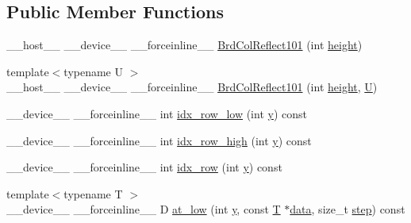 \subsection*{Public Member Functions}
\begin{DoxyCompactItemize}
\item 
\-\_\-\-\_\-host\-\_\-\-\_\- \-\_\-\-\_\-device\-\_\-\-\_\- \-\_\-\-\_\-forceinline\-\_\-\-\_\- \hyperlink{structcv_1_1gpu_1_1device_1_1BrdColReflect101_a6052653f2845007680047223cfd32a13}{Brd\-Col\-Reflect101} (int \hyperlink{highgui__c_8h_adc7b4b8a6ef510e136071efbc9cd9a58}{height})
\item 
{\footnotesize template$<$typename U $>$ }\\\-\_\-\-\_\-host\-\_\-\-\_\- \-\_\-\-\_\-device\-\_\-\-\_\- \-\_\-\-\_\-forceinline\-\_\-\-\_\- \hyperlink{structcv_1_1gpu_1_1device_1_1BrdColReflect101_ad760f4377beec9378172e994a9469958}{Brd\-Col\-Reflect101} (int \hyperlink{highgui__c_8h_adc7b4b8a6ef510e136071efbc9cd9a58}{height}, \hyperlink{core__c_8h_aa9c521f41af9a5191e5e4b6ffbae211a}{U})
\item 
\-\_\-\-\_\-device\-\_\-\-\_\- \-\_\-\-\_\-forceinline\-\_\-\-\_\- int \hyperlink{structcv_1_1gpu_1_1device_1_1BrdColReflect101_ad88211682b56ad96312a9cea8eb9201d}{idx\-\_\-row\-\_\-low} (int \hyperlink{highgui__c_8h_af1202c02b14870c18fb3a1da73e9e7c7}{y}) const 
\item 
\-\_\-\-\_\-device\-\_\-\-\_\- \-\_\-\-\_\-forceinline\-\_\-\-\_\- int \hyperlink{structcv_1_1gpu_1_1device_1_1BrdColReflect101_a4a1a54ee230a6066301e8a7f9b0f03c6}{idx\-\_\-row\-\_\-high} (int \hyperlink{highgui__c_8h_af1202c02b14870c18fb3a1da73e9e7c7}{y}) const 
\item 
\-\_\-\-\_\-device\-\_\-\-\_\- \-\_\-\-\_\-forceinline\-\_\-\-\_\- int \hyperlink{structcv_1_1gpu_1_1device_1_1BrdColReflect101_ac24f041d475d9361a8c478e0241d5b2a}{idx\-\_\-row} (int \hyperlink{highgui__c_8h_af1202c02b14870c18fb3a1da73e9e7c7}{y}) const 
\item 
{\footnotesize template$<$typename T $>$ }\\\-\_\-\-\_\-device\-\_\-\-\_\- \-\_\-\-\_\-forceinline\-\_\-\-\_\- D \hyperlink{structcv_1_1gpu_1_1device_1_1BrdColReflect101_aee8760c932a02b99c74d5c8a461d7178}{at\-\_\-low} (int \hyperlink{highgui__c_8h_af1202c02b14870c18fb3a1da73e9e7c7}{y}, const \hyperlink{calib3d_8hpp_a3efb9551a871ddd0463079a808916717}{T} $\ast$\hyperlink{legacy_8hpp_ab9fe6c09e6d02865a953fffc12fe6ca0}{data}, size\-\_\-t \hyperlink{legacy_8hpp_abc16e65f240ed0c8f3e876e8732c0a33}{step}) const 
\item 

\end{DoxyCompactItemize}
